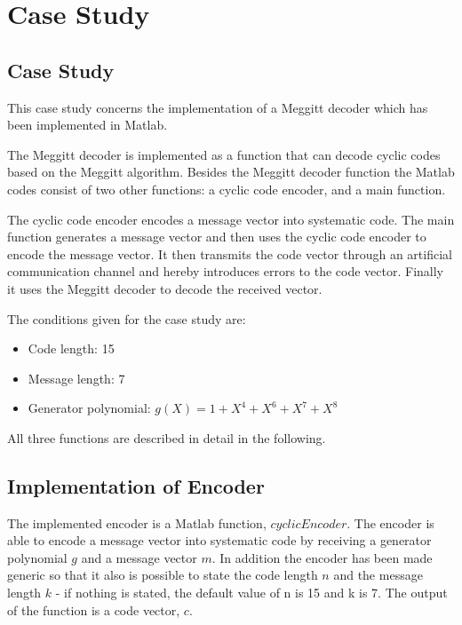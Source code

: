 \documentclass[Main]{subfiles}
\begin{document}
\section{Case Study}

%
%
%

\subsection{Case Study}
This case study concerns the implementation of a Meggitt decoder which has been implemented in Matlab. 

\noindent The Meggitt decoder is implemented as a function that can decode cyclic codes based on the Meggitt algorithm. Besides the Meggitt decoder function the Matlab codes consist of two other functions: a cyclic code encoder, and a main function.

\noindent The cyclic code encoder encodes a message vector into systematic code. The main function generates a message vector and then uses the cyclic code encoder to encode the message vector. It then transmits the code vector through an artificial communication channel and hereby introduces errors to the code vector. Finally it uses the Meggitt decoder to decode the received vector. 

\noindent The conditions given for the case study are: 
\begin{itemize} \itemsep0pt \parskip0pt 
\item Code length: 15
\item Message length: 7
\item Generator polynomial: $g(X)=1+X^4+X^6+X^7+X^8$
\end{itemize} 

\noindent All three functions are described in detail in the following. 


\subsection{Implementation of Encoder}
The implemented encoder is a Matlab function, $cyclicEncoder$. The encoder is able to encode a message vector into systematic code by receiving a generator polynomial $g$ and a message vector $m$. In addition the encoder has been made generic so that it also is possible to state the code length $n$ and the message length $k$ - if nothing is stated, the default value of n is 15 and k is 7. The output of the function is a code vector, $c$. 
\end{document}
